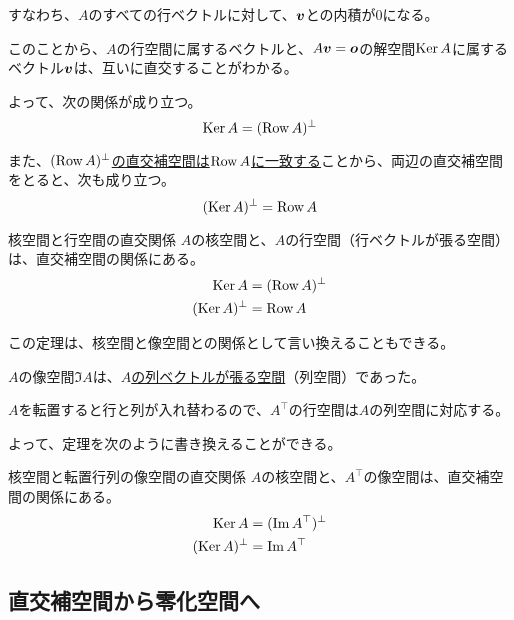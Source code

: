 \documentclass[../../../topic_linear-algebra]{subfiles}
\begin{document}
すなわち、$A$のすべての行ベクトルに対して、$\vb*{v}$との内積が0になる。

\br

このことから、$A$の行空間に属するベクトルと、$A\vb*{v} = \vb*{o}$の解空間$\operatorname{Ker} A$に属するベクトル$\vb*{v}$は、互いに直交することがわかる。

よって、次の関係が成り立つ。
\begin{equation*}
  \operatorname{Ker} A = (\operatorname{Row} A)^\perp
\end{equation*}

また、\hyperref[thm:double-orthogonal-complement]{$(\operatorname{Row} A)^\perp$の直交補空間は$\operatorname{Row} A$に一致する}ことから、両辺の直交補空間をとると、次も成り立つ。
\begin{equation*}
  (\operatorname{Ker} A)^\perp = \operatorname{Row} A
\end{equation*}

\begin{theorem}{核空間と行空間の直交関係}\label{thm:kernel-row-orthogonality}
  $A$の核空間と、$A$の行空間（行ベクトルが張る空間）は、直交補空間の関係にある。
  \begin{align*}
    \operatorname{Ker} A &= (\operatorname{Row} A)^\perp \\
    (\operatorname{Ker} A)^\perp &= \operatorname{Row} A
  \end{align*}
\end{theorem}

この定理は、核空間と像空間との関係として言い換えることもできる。

\br

$A$の像空間$\Im A$は、\hyperref[sec:image-and-column-space]{$A$の列ベクトルが張る空間}（列空間）であった。

$A$を転置すると行と列が入れ替わるので、$A^\top$の行空間は$A$の列空間に対応する。

\br

よって、定理を次のように書き換えることができる。

\begin{theorem}{核空間と転置行列の像空間の直交関係}
  $A$の核空間と、$A^\top$の像空間は、直交補空間の関係にある。
  \begin{align*}
    \operatorname{Ker} A &= (\Im A^\top)^\perp \\
    (\operatorname{Ker} A)^\perp &= \Im A^\top
  \end{align*}
\end{theorem}

\subsection{直交補空間から零化空間へ}
\end{document}
